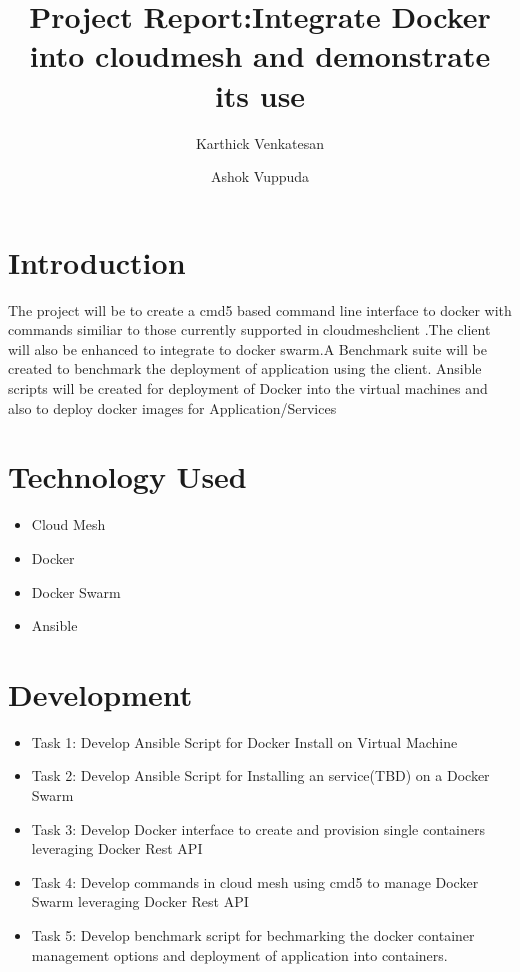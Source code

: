 \documentclass[9pt,twocolumn,twoside]{styles/osajnl}
\title{Project Report:Integrate Docker  into cloudmesh and demonstrate its use}
\author[1]{Karthick Venkatesan}
\author[1]{Ashok Vuppuda}
\affil[1]{School of Informatics and Computing, Bloomington, IN 47408, U.S.A.}
\begin{document}
\maketitle

\section{Introduction}

The project will be to create a cmd5 based command line interface to docker with commands similiar to those currently supported in cloudmeshclient .The client will also be enhanced to integrate  to docker swarm.A Benchmark suite will be created to benchmark the deployment of application using the client.
Ansible scripts will be created for deployment of Docker into the virtual machines and also to deploy docker images  for Application/Services

\section{Technology Used}

\renewcommand{\labelitemi}{\scriptsize$\square$} 

\begin{itemize}
\item Cloud Mesh
\item Docker
\item Docker Swarm
\item Ansible
\end{itemize}

\section{Development}

\renewcommand{\labelitemi}{\scriptsize$\square$} 

\begin{itemize}
\item Task 1: Develop Ansible Script for Docker Install on Virtual Machine
 
\item Task 2: Develop Ansible Script for Installing an service(TBD) on a Docker Swarm 

\item Task 3: Develop Docker interface to create and provision single containers leveraging Docker Rest API

\item Task 4: Develop commands in cloud mesh using cmd5 to manage Docker Swarm leveraging Docker Rest API

\item Task 5: Develop benchmark script for bechmarking the docker container management options and deployment of application into containers.
\end{itemize}
\end{document}
